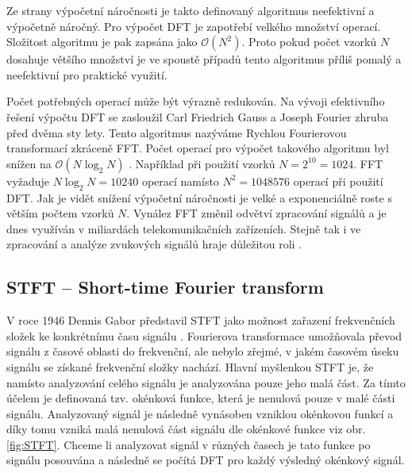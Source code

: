   Ze strany výpočetní náročnosti je takto definovaný algoritmus neefektivní a výpočetně náročný.
  Pro výpočet \acs{DFT} je zapotřebí velkého množství operací. Složitost algoritmu je pak zapsána jako $\mathcal{O}(N^2)$.
  Proto pokud počet vzorků $N$ dosahuje většího množství je ve spoustě případů tento algoritmus příliš pomalý a neefektivní pro praktické využití.

  Počet potřebných operací může být výrazně redukován. 
  Na vývoji efektivního řešení výpočtu \acs{DFT} se zasloužil Carl Friedrich Gauss a Joseph Fourier zhruba před dvěma sty lety. Tento algoritmus nazýváme Rychlou Fourierovou transformací zkráceně FFT.
  Počet operací pro výpočet takového algoritmu byl snížen na $\mathcal{O}(N \log_2 N)$ \cite{fundamental_of_music_processing}.
  Například při použití vzorků $N = 2^{10} = 1024$. \acs{FFT} vyžaduje $N\log_2N = 10240 $ operací namísto $N^2 = 1048576$ operací při použití \acs{DFT}. Jak je vidět snížení výpočetní náročnosti je velké a exponenciálně roste s větším počtem vzorků $N$.
  Vynález \acs{FFT} změnil odvětví zpracování signálů a je dnes využíván v miliardách telekomunikačních zařízeních. Stejně tak i ve zpracování a analýze zvukových signálů hraje důležitou roli \cite{fundamental_of_music_processing}.

  
  \subsection{STFT -- Short-time Fourier transform} \label{sec:STFT}

  V roce 1946 Dennis Gabor představil \acs{STFT} jako možnost zařazení frekvenčních složek ke konkrétnímu času signálu \cite{strichartz2003guide}.
  Fourierova transformace umožňovala převod signálu z časové oblasti do frekvenční, ale nebylo zřejmé, v jakém časovém úseku signálu se získané frekvenční složky nachází.
  Hlavní myšlenkou \acs{STFT} je, že namísto analyzování celého signálu je analyzována pouze jeho malá část.
  Za tímto účelem je definovaná tzv. okénková funkce, která je nenulová pouze v malé části signálu.
  Analyzovaný signál je následně vynásoben vzniklou okénkovou funkcí a díky tomu vzniká malá nenulová část signálu dle okénkové funkce viz obr. \ref{fig:STFT}.
  Chceme li analyzovat signál v různých časech je tato funkce po signálu posouvána a následně se počítá \acs{DFT} pro každý výsledný okénkový signál.

